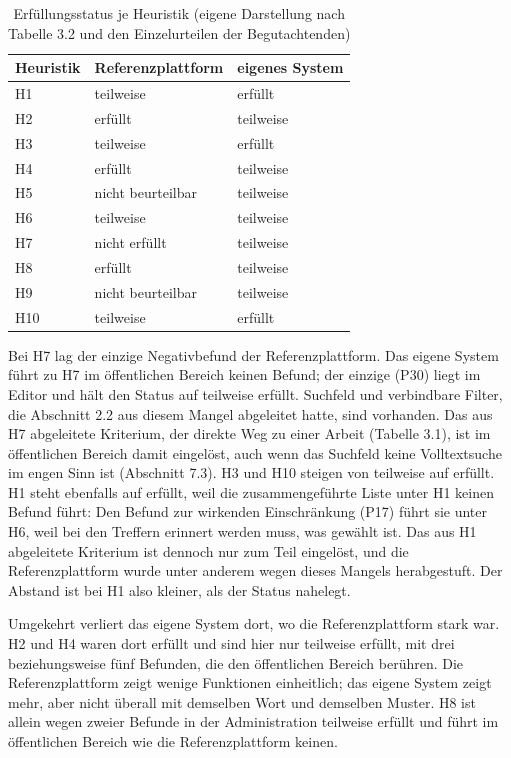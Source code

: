 \begin{table}[htbp]
	\centering
	\small
	\caption[Erfüllungsstatus je Heuristik]{Erfüllungsstatus je Heuristik (eigene Darstellung nach Tabelle 3.2 und den Einzelurteilen der Begutachtenden)}
	\label{tab:erfuellungsstatus}
	\begin{tabularx}{\textwidth}{@{}L{2.4cm}YY@{}}
		\toprule
		\textbf{Heuristik} & \textbf{Referenzplattform} & \textbf{eigenes System} \\
		\midrule
		H1 & teilweise & erfüllt \\
		H2 & erfüllt & teilweise \\
		H3 & teilweise & erfüllt \\
		H4 & erfüllt & teilweise \\
		H5 & nicht beurteilbar & teilweise \\
		H6 & teilweise & teilweise \\
		H7 & nicht erfüllt & teilweise \\
		H8 & erfüllt & teilweise \\
		H9 & nicht beurteilbar & teilweise \\
		H10 & teilweise & erfüllt \\
		\bottomrule
	\end{tabularx}
\end{table}

Bei H7 lag der einzige Negativbefund der Referenzplattform. Das eigene System führt zu H7 im öffentlichen Bereich keinen Befund; der einzige (P30) liegt im Editor und hält den Status auf teilweise erfüllt. Suchfeld und verbindbare Filter, die Abschnitt 2.2 aus diesem Mangel abgeleitet hatte, sind vorhanden. Das aus H7 abgeleitete Kriterium, der direkte Weg zu einer Arbeit (Tabelle 3.1), ist im öffentlichen Bereich damit eingelöst, auch wenn das Suchfeld keine Volltextsuche im engen Sinn ist (Abschnitt 7.3). H3 und H10 steigen von teilweise auf erfüllt. H1 steht ebenfalls auf erfüllt, weil die zusammengeführte Liste unter H1 keinen Befund führt: Den Befund zur wirkenden Einschränkung (P17) führt sie unter H6, weil bei den Treffern erinnert werden muss, was gewählt ist. Das aus H1 abgeleitete Kriterium ist dennoch nur zum Teil eingelöst, und die Referenzplattform wurde unter anderem wegen dieses Mangels herabgestuft. Der Abstand ist bei H1 also kleiner, als der Status nahelegt.

Umgekehrt verliert das eigene System dort, wo die Referenzplattform stark war. H2 und H4 waren dort erfüllt und sind hier nur teilweise erfüllt, mit drei beziehungsweise fünf Befunden, die den öffentlichen Bereich berühren. Die Referenzplattform zeigt wenige Funktionen einheitlich; das eigene System zeigt mehr, aber nicht überall mit demselben Wort und demselben Muster. H8 ist allein wegen zweier Befunde in der Administration teilweise erfüllt und führt im öffentlichen Bereich wie die Referenzplattform keinen.

